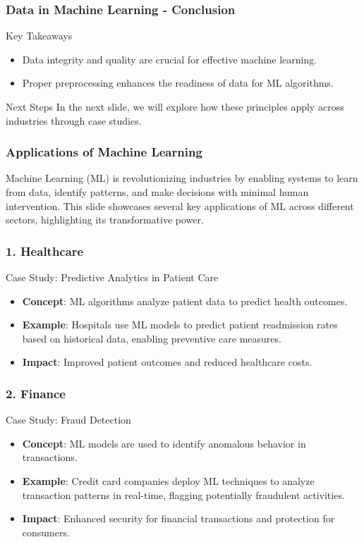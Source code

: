 \documentclass{beamer}
\begin{document}
\begin{frame}[fragile]
    \frametitle{Data in Machine Learning - Conclusion}
    \begin{block}{Key Takeaways}
        \begin{itemize}
            \item Data integrity and quality are crucial for effective machine learning.
            \item Proper preprocessing enhances the readiness of data for ML algorithms.
        \end{itemize}
    \end{block}
    \begin{block}{Next Steps}
        In the next slide, we will explore how these principles apply across industries through case studies.
    \end{block}
\end{frame}

\begin{frame}[fragile]
    \frametitle{Applications of Machine Learning}
    Machine Learning (ML) is revolutionizing industries by enabling systems to learn from data, identify patterns, and make decisions with minimal human intervention. 
    This slide showcases several key applications of ML across different sectors, highlighting its transformative power.
\end{frame}

\begin{frame}[fragile]
    \frametitle{1. Healthcare}
    \begin{block}{Case Study: Predictive Analytics in Patient Care}
        \begin{itemize}
            \item \textbf{Concept}: ML algorithms analyze patient data to predict health outcomes.
            \item \textbf{Example}: Hospitals use ML models to predict patient readmission rates based on historical data, enabling preventive care measures.
            \item \textbf{Impact}: Improved patient outcomes and reduced healthcare costs.
        \end{itemize}
    \end{block}
\end{frame}

\begin{frame}[fragile]
    \frametitle{2. Finance}
    \begin{block}{Case Study: Fraud Detection}
        \begin{itemize}
            \item \textbf{Concept}: ML models are used to identify anomalous behavior in transactions.
            \item \textbf{Example}: Credit card companies deploy ML techniques to analyze transaction patterns in real-time, flagging potentially fraudulent activities.
            \item \textbf{Impact}: Enhanced security for financial transactions and protection for consumers.
        \end{itemize}
    \end{block}
\end{frame}
\end{document}
